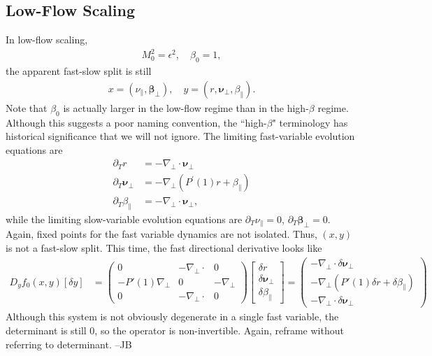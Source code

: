 \documentclass{article}
\newcommand{\para}{\parallel}
\newcommand{\np}{\nabla_\perp}
\newcommand{\pth} [1] {\left( #1 \right) }
\newcommand{\bmat} [1] {\begin{bmatrix} #1 \end{bmatrix}}
\newcommand{\pmat} [1] {\begin{pmatrix} #1 \end{pmatrix}}
\begin{document}
\subsection{Low-Flow Scaling}
In low-flow scaling, 
\begin{align*}
M_0^2 = \epsilon^2,\quad \beta_0 = 1,
\end{align*}
the apparent fast-slow split is still
\begin{align*}
x = (\nu_\parallel,\bm{\beta}_\perp),\quad y = (r,\bm{\nu}_\perp,\beta_\parallel).
\end{align*}
Note that $\beta_0$ is actually larger in the low-flow regime than in the high-$\beta$ regime. Although this suggests a poor naming convention, the ``high-$\beta$" terminology has historical significance that we will not ignore. 
The limiting fast-variable evolution equations are
\begin{align*}
\partial_Tr &= -\np\cdot\bm{\nu}_\perp\\
\partial_T\bm{\nu}_\perp & = -\np (P^\prime(1)r + \beta_\parallel)\\
\partial_T\beta_\parallel & = -\np\cdot\bm{\nu}_\perp,
\end{align*}
while the limiting slow-variable evolution equations are $\partial_T\nu_\parallel = 0$, $\partial_T\bm{\beta}_\perp = 0$. Again, fixed points for the fast variable dynamics are not isolated. Thus, $(x,y)$ is not a fast-slow split. This time, the fast directional derivative looks like 
\begin{align} 
    D_yf_0(x,y) [\delta y] 
    &= \pmat{0 & -\np \cdot & 0 \\ -P'(1)\np & 0 & -\np \\ 0 & -\np \cdot & 0}
    \bmat{\delta r \\ \delta \bm{\nu}_\perp \\ \delta \beta_\para} = \pmat{-\np \cdot \delta \bm{\nu}_\perp \\ -\np \pth{P'(1)\delta r + \delta \beta_\para} \\ -\np \cdot \delta \bm{\nu}_\perp}
\end{align}
Although this system is not obviously degenerate in a single fast variable, the determinant is still $0$, so the operator is non-invertible. {\color{red}Again, reframe without referring to determinant. --JB}
\end{document}
